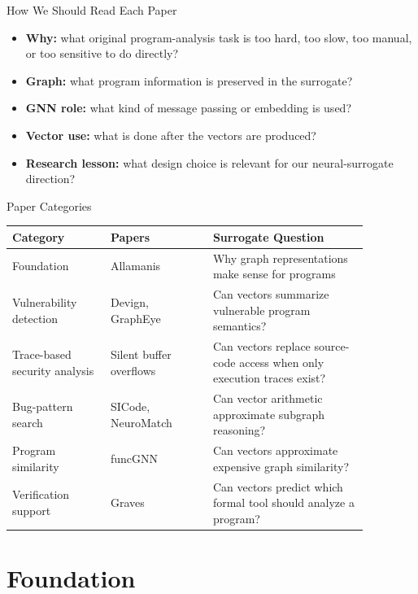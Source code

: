 \documentclass[10pt]{beamer}
\begin{document}
\begin{frame}{How We Should Read Each Paper}
  \begin{itemize}
    \item \textbf{Why:} what original program-analysis task is too hard, too slow, too manual, or too sensitive to do directly?
    \item \textbf{Graph:} what program information is preserved in the surrogate?
    \item \textbf{GNN role:} what kind of message passing or embedding is used?
    \item \textbf{Vector use:} what is done after the vectors are produced?
    \item \textbf{Research lesson:} what design choice is relevant for our neural-surrogate direction?
  \end{itemize}
\end{frame}

\begin{frame}{Paper Categories}
  \footnotesize
  \setlength{\tabcolsep}{2pt}
  \begin{tabular}{p{0.24\linewidth}p{0.25\linewidth}p{0.38\linewidth}}
    \textbf{Category} & \textbf{Papers} & \textbf{Surrogate Question} \\
    \hline
    Foundation & Allamanis & Why graph representations make sense for programs \\
    Vulnerability detection & Devign, GraphEye & Can vectors summarize vulnerable program semantics? \\
    Trace-based security analysis & Silent buffer overflows & Can vectors replace source-code access when only execution traces exist? \\
    Bug-pattern search & SICode, NeuroMatch & Can vector arithmetic approximate subgraph reasoning? \\
    Program similarity & funcGNN & Can vectors approximate expensive graph similarity? \\
    Verification support & Graves & Can vectors predict which formal tool should analyze a program? \\
  \end{tabular}
\end{frame}

\section{Foundation}
\end{document}
